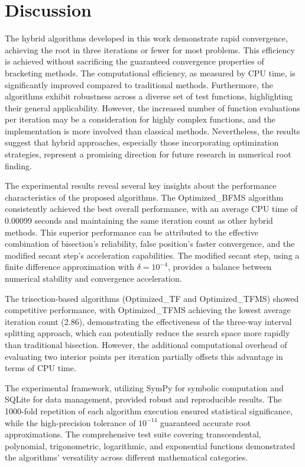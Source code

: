 \documentclass[amsmath, amssymb, aps]{revtex4-2}
\begin{document}
\section{Discussion}

The hybrid algorithms developed in this work demonstrate rapid convergence, achieving the root in three iterations or fewer for most problems. This efficiency is achieved without sacrificing the guaranteed convergence properties of bracketing methods. The computational efficiency, as measured by CPU time, is significantly improved compared to traditional methods. Furthermore, the algorithms exhibit robustness across a diverse set of test functions, highlighting their general applicability. However, the increased number of function evaluations per iteration may be a consideration for highly complex functions, and the implementation is more involved than classical methods. Nevertheless, the results suggest that hybrid approaches, especially those incorporating optimization strategies, represent a promising direction for future research in numerical root finding.

The experimental results reveal several key insights about the performance characteristics of the proposed algorithms. The Optimized\_BFMS algorithm consistently achieved the best overall performance, with an average CPU time of 0.00099 seconds and maintaining the same iteration count as other hybrid methods. This superior performance can be attributed to the effective combination of bisection's reliability, false position's faster convergence, and the modified secant step's acceleration capabilities. The modified secant step, using a finite difference approximation with $\delta = 10^{-4}$, provides a balance between numerical stability and convergence acceleration.

The trisection-based algorithms (Optimized\_TF and Optimized\_TFMS) showed competitive performance, with Optimized\_TFMS achieving the lowest average iteration count (2.86), demonstrating the effectiveness of the three-way interval splitting approach, which can potentially reduce the search space more rapidly than traditional bisection. However, the additional computational overhead of evaluating two interior points per iteration partially offsets this advantage in terms of CPU time.

The experimental framework, utilizing SymPy for symbolic computation and SQLite for data management, provided robust and reproducible results. The 1000-fold repetition of each algorithm execution ensured statistical significance, while the high-precision tolerance of $10^{-14}$ guaranteed accurate root approximations. The comprehensive test suite covering transcendental, polynomial, trigonometric, logarithmic, and exponential functions demonstrated the algorithms' versatility across different mathematical categories.
\end{document}
